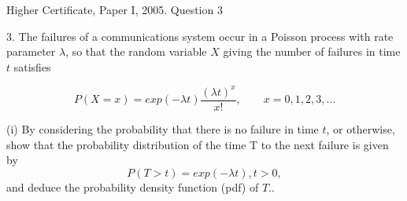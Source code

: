 \documentclass[a4paper,12pt]{article}
\begin{document}
Higher Certificate, Paper I, 2005. Question 3

\begin{framed}
3. The failures of a communications system occur in a Poisson process with rate
parameter $\lambda$, so that the random variable $X$ giving the number of failures in time $t$
satisfies

\[P(X=x) =  exp(-\lambda t) \frac{(\lambda t)^x}{x!}, \qquad x=0,1,2,3, \ldots\]

(i) By considering the probability that there is no failure in time $t$, or otherwise,
show that the probability distribution of the time T to the next failure is given
by
\[P(T > t ) = exp(−\lambda t ), t > 0 ,\]
and deduce the probability density function (pdf) of $T$..
\end{framed}
\end{document}
